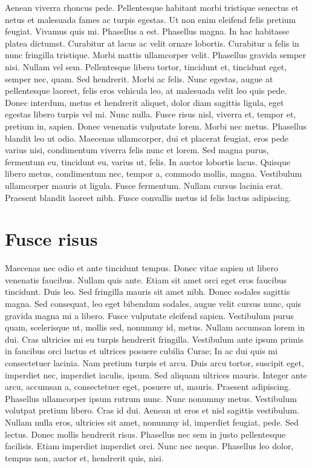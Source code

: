 \documentclass[a4paper,11pt]{scrartcl}
\begin{document}
 Aenean viverra rhoncus pede. Pellentesque habitant morbi tristique senectus et netus et malesuada fames ac turpis egestas. Ut non enim eleifend felis pretium feugiat. Vivamus quis mi. Phasellus a est. Phasellus magna. In hac habitasse platea dictumst. Curabitur at lacus ac velit ornare lobortis. Curabitur a felis in nunc fringilla tristique. Morbi mattis ullamcorper velit. Phasellus gravida semper nisi. Nullam vel sem. Pellentesque libero tortor, tincidunt et, tincidunt eget, semper nec, quam. Sed hendrerit. Morbi ac felis. Nunc egestas, augue at pellentesque laoreet, felis eros vehicula leo, at malesuada velit leo quis pede. Donec interdum, metus et hendrerit aliquet, dolor diam sagittis ligula, eget egestas libero turpis vel mi. Nunc nulla. Fusce risus nisl, viverra et, tempor et, pretium in, sapien. Donec venenatis vulputate lorem. Morbi nec metus. Phasellus blandit leo ut odio. Maecenas ullamcorper, dui et placerat feugiat, eros pede varius nisi, condimentum viverra felis nunc et lorem. Sed magna purus, fermentum eu, tincidunt eu, varius ut, felis. In auctor lobortis lacus. Quisque libero metus, condimentum nec, tempor a, commodo mollis, magna. Vestibulum ullamcorper mauris at ligula. Fusce fermentum. Nullam cursus lacinia erat. Praesent blandit laoreet nibh. Fusce convallis metus id felis luctus adipiscing.
 
 \section{Fusce risus}
 Maecenas nec odio et ante tincidunt tempus. Donec vitae sapien ut libero venenatis faucibus. Nullam quis ante. Etiam sit amet orci eget eros faucibus tincidunt. Duis leo. Sed fringilla mauris sit amet nibh. Donec sodales sagittis magna. Sed consequat, leo eget bibendum sodales, augue velit cursus nunc, quis gravida magna mi a libero. Fusce vulputate eleifend sapien. Vestibulum purus quam, scelerisque ut, mollis sed, nonummy id, metus. Nullam accumsan lorem in dui. Cras ultricies mi eu turpis hendrerit fringilla. Vestibulum ante ipsum primis in faucibus orci luctus et ultrices posuere cubilia Curae; In ac dui quis mi consectetuer lacinia. Nam pretium turpis et arcu. Duis arcu tortor, suscipit eget, imperdiet nec, imperdiet iaculis, ipsum. Sed aliquam ultrices mauris. Integer ante arcu, accumsan a, consectetuer eget, posuere ut, mauris. Praesent adipiscing. Phasellus ullamcorper ipsum rutrum nunc. Nunc nonummy metus. Vestibulum volutpat pretium libero. Cras id dui. Aenean ut eros et nisl sagittis vestibulum. Nullam nulla eros, ultricies sit amet, nonummy id, imperdiet feugiat, pede. Sed lectus. Donec mollis hendrerit risus. Phasellus nec sem in justo pellentesque facilisis. Etiam imperdiet imperdiet orci. Nunc nec neque. Phasellus leo dolor, tempus non, auctor et, hendrerit quis, nisi.
 
\end{document}
